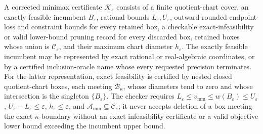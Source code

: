A corrected minimax certificate \(\mathscr K_{\varepsilon}\) consists of a finite quotient-chart cover, an exactly feasible incumbent \(B_{\varepsilon}\), rational bounds \(L_{\varepsilon},U_{\varepsilon}\), outward-rounded endpoint-loss and constraint bounds for every retained box, a checkable exact-infeasibility or valid lower-bound pruning record for every discarded box, retained boxes whose union is \(\mathcal C_\varepsilon\), and their maximum chart diameter \(h_{\varepsilon}\).  The exactly feasible incumbent may be represented by exact rational or real-algebraic coordinates, or by a certified inclusion-oracle name whose every requested precision terminates.  For the latter representation, exact feasibility is certified by nested closed quotient-chart boxes, each meeting \(\mathcal B_\kappa\), whose diameters tend to zero and whose intersection is the singleton \(\{B_{\varepsilon}\}\).  The checker requires \(L_{\varepsilon}\le v_{\mathrm{mm}}\le w(B_{\varepsilon})\le U_{\varepsilon}\), \(U_{\varepsilon}-L_{\varepsilon}\le\varepsilon\), \(h_{\varepsilon}\le\varepsilon\), and \(\mathcal A_{\mathrm{mm}}\subseteq\mathcal C_\varepsilon\); it never accepts deletion of a box meeting the exact \(\kappa\)-boundary without an exact infeasibility certificate or a valid objective lower bound exceeding the incumbent upper bound.